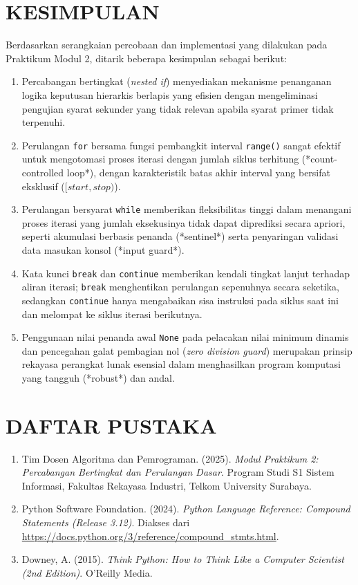 \documentclass[12pt,a4paper]{article}
\begin{document}
\section{KESIMPULAN}
Berdasarkan serangkaian percobaan dan implementasi yang dilakukan pada Praktikum Modul 2, ditarik beberapa kesimpulan sebagai berikut:
\begin{enumerate}
    \item Percabangan bertingkat (\textit{nested if}) menyediakan mekanisme penanganan logika keputusan hierarkis berlapis yang efisien dengan mengeliminasi pengujian syarat sekunder yang tidak relevan apabila syarat primer tidak terpenuhi.
    \item Perulangan \texttt{for} bersama fungsi pembangkit interval \texttt{range()} sangat efektif untuk mengotomasi proses iterasi dengan jumlah siklus terhitung (*count-controlled loop*), dengan karakteristik batas akhir interval yang bersifat eksklusif ($[start, stop)$).
    \item Perulangan bersyarat \texttt{while} memberikan fleksibilitas tinggi dalam menangani proses iterasi yang jumlah eksekusinya tidak dapat diprediksi secara apriori, seperti akumulasi berbasis penanda (*sentinel*) serta penyaringan validasi data masukan konsol (*input guard*).
    \item Kata kunci \texttt{break} dan \texttt{continue} memberikan kendali tingkat lanjut terhadap aliran iterasi; \texttt{break} menghentikan perulangan sepenuhnya secara seketika, sedangkan \texttt{continue} hanya mengabaikan sisa instruksi pada siklus saat ini dan melompat ke siklus iterasi berikutnya.
    \item Penggunaan nilai penanda awal \texttt{None} pada pelacakan nilai minimum dinamis dan pencegahan galat pembagian nol (\textit{zero division guard}) merupakan prinsip rekayasa perangkat lunak esensial dalam menghasilkan program komputasi yang tangguh (*robust*) dan andal.
\end{enumerate}

\section{DAFTAR PUSTAKA}

\begin{enumerate}
    \item Tim Dosen Algoritma dan Pemrograman. (2025). \textit{Modul Praktikum 2: Percabangan Bertingkat dan Perulangan Dasar}. Program Studi S1 Sistem Informasi, Fakultas Rekayasa Industri, Telkom University Surabaya.

    \item Python Software Foundation. (2024). \textit{Python Language Reference: Compound Statements (Release 3.12)}. Diakses dari \url{https://docs.python.org/3/reference/compound_stmts.html}.

    \item Downey, A. (2015). \textit{Think Python: How to Think Like a Computer Scientist (2nd Edition)}. O'Reilly Media.
\end{enumerate}
\end{document}
